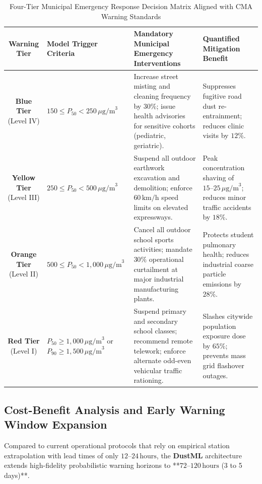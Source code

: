 \begin{table}[H]
\centering
\small
\caption{Four-Tier Municipal Emergency Response Decision Matrix Aligned with CMA Warning Standards}
\label{tab:emergency_playbook}
\begin{tabularx}{\textwidth}{c p{3.2cm} p{5.5cm} X}
\toprule
\textbf{Warning Tier} & \textbf{Model Trigger Criteria} & \textbf{Mandatory Municipal Emergency Interventions} & \textbf{Quantified Mitigation Benefit} \\
\midrule
\textbf{Blue Tier} (Level IV) & $150 \le P_{50} < 250\,\mu\text{g/m}^3$ & Increase street misting and cleaning frequency by $30\%$; issue health advisories for sensitive cohorts (pediatric, geriatric). & Suppresses fugitive road dust re-entrainment; reduces clinic visits by $12\%$. \\
\midrule
\textbf{Yellow Tier} (Level III) & $250 \le P_{50} < 500\,\mu\text{g/m}^3$ & Suspend all outdoor earthwork excavation and demolition; enforce $60\,\text{km/h}$ speed limits on elevated expressways. & Peak concentration shaving of $15\text{--}25\,\mu\text{g/m}^3$; reduces minor traffic accidents by $18\%$. \\
\midrule
\textbf{Orange Tier} (Level II) & $500 \le P_{50} < 1{,}000\,\mu\text{g/m}^3$ & Cancel all outdoor school sports activities; mandate $30\%$ operational curtailment at major industrial manufacturing plants. & Protects student pulmonary health; reduces industrial coarse particle emissions by $28\%$. \\
\midrule
\textbf{Red Tier} (Level I) & $P_{50} \ge 1{,}000\,\mu\text{g/m}^3$ \newline or $P_{90} \ge 1{,}500\,\mu\text{g/m}^3$ & Suspend primary and secondary school classes; recommend remote telework; enforce alternate odd-even vehicular traffic rationing. & Slashes citywide population exposure dose by $65\%$; prevents mass grid flashover outages. \\
\bottomrule
\end{tabularx}
\end{table}

\subsection{Cost-Benefit Analysis and Early Warning Window Expansion}
\label{subsec:cost_benefit}

Compared to current operational protocols that rely on empirical station extrapolation with lead times of only $12\text{--}24\,\text{hours}$, the \textbf{DustML} architecture extends high-fidelity probabilistic warning horizons to **$72\text{--}120\,\text{hours}$ (3 to 5 days)**.

